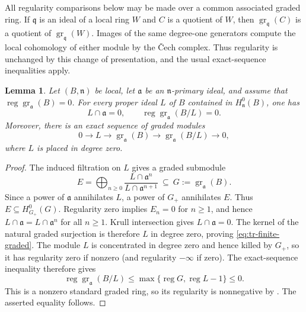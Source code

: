 \documentclass[11pt,reqno]{amsart}
\numberwithin{equation}{section}
\newtheorem{lemma}[theorem]{Lemma}
\theoremstyle{definition}
\begin{document}
All regularity comparisons below may be made over a common
associated graded ring. If $\mathfrak q$ is an ideal of a local ring $W$
and $C$ is a quotient of $W$, then
$\operatorname{gr}_{\mathfrak q}(C)$ is a quotient of
$\operatorname{gr}_{\mathfrak q}(W)$. Images of the same degree-one
generators compute the local cohomology of either module by the
\v{C}ech complex. Thus regularity is unchanged by this change of
presentation, and the usual exact-sequence inequalities apply.

\begin{lemma}\label{lem:tr-finite-part}
Let $(B,\mathfrak n)$ be local, let $\mathfrak a$ be an
$\mathfrak n$-primary ideal, and assume that
$\operatorname{reg}\operatorname{gr}_{\mathfrak a}(B)=0$.
For every proper ideal $L$ of $B$ contained in $H^0_{\mathfrak n}(B)$,
one has
\[
 L\cap\mathfrak a=0,\qquad
 \operatorname{reg}\operatorname{gr}_{\mathfrak a}(B/L)=0.
\]
Moreover, there is an exact sequence of graded modules
\begin{equation}\label{eq:tr-finite-graded}
 0\longrightarrow L\longrightarrow
 \operatorname{gr}_{\mathfrak a}(B)\longrightarrow
 \operatorname{gr}_{\mathfrak a}(B/L)\longrightarrow0,
\end{equation}
where $L$ is placed in degree zero.
\end{lemma}

\begin{proof}
The induced filtration on $L$ gives a graded submodule
\[
 E=\bigoplus_{n\geq0}
 \frac{L\cap\mathfrak a^n}{L\cap\mathfrak a^{n+1}}
 \ \subseteq\ G:=\operatorname{gr}_{\mathfrak a}(B).
\]
Since a power of $\mathfrak a$ annihilates $L$, a power of $G_+$ annihilates
$E$. Thus $E\subseteq H^0_{G_+}(G)$. Regularity zero implies $E_n=0$ for
$n\geq1$, and hence
$L\cap\mathfrak a=L\cap\mathfrak a^n$ for all $n\geq1$.
Krull intersection gives $L\cap\mathfrak a=0$.
The kernel of the natural graded surjection is therefore
$L$ in degree zero, proving \eqref{eq:tr-finite-graded}.
The module $L$ is concentrated in degree zero and hence killed by $G_+$,
so it has regularity zero if nonzero (and regularity $-\infty$
if zero). The exact-sequence inequality therefore gives
\[
 \operatorname{reg}\operatorname{gr}_{\mathfrak a}(B/L)
 \leq\max\{\operatorname{reg}G,\operatorname{reg}L-1\}\leq0.
\]
This is a nonzero standard graded ring, so its regularity is
nonnegative by \cite[Corollary~2.3(ii)]{Trung1998}.
The asserted equality follows.
\end{proof}
\end{document}
